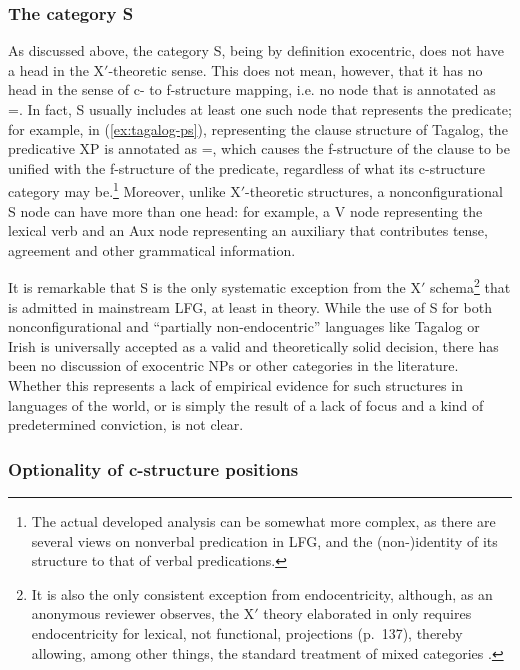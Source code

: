\documentclass[output=paper,hidelinks]{langscibook}
\begin{document}
 \subsubsection{The category S}\label{sec:CoreConcepts:S}
 
 As discussed above, the category S, being by definition exocentric, does not have a head in the X$'$-theoretic sense. This does not mean, however, that it has no head in the sense of c- to f-structure mapping, i.e. no node that is annotated as \UP=\DOWN. In fact, S usually includes at least one such node that represents the predicate; for example, in (\ref{ex:tagalog-ps}), representing the clause structure of Tagalog, the predicative XP is annotated as \UP=\DOWN, which causes the f-structure of the clause to be unified with the f-structure of the predicate, regardless of what its c-structure category may be.\footnote{The actual developed analysis can be somewhat more complex, as there are several views on nonverbal predication in LFG, and the (non-)identity of its structure to that of verbal predications.} Moreover, unlike X$'$-theoretic structures, a nonconfigurational S node can have more than one head: for example, a V node representing the lexical verb and an Aux node representing an auxiliary that contributes tense, agreement and other grammatical information.
 
 It is remarkable that S is the only systematic exception from the X$'$ schema\footnote{It is also the only consistent exception from endocentricity, although, as an anonymous reviewer observes, the X$'$ theory elaborated in \textcite{BresnanEtAl2016} only requires endocentricity for lexical, not functional, projections (p.~137), thereby allowing, among other things, the standard treatment of mixed categories \parencite[311ff.]{BresnanEtAl2016}.} that is admitted in mainstream LFG, at least in theory. While the use of S for both nonconfigurational and ``partially non-endocentric'' languages like Tagalog or Irish is universally accepted as a valid and theoretically solid decision, there has been no discussion of exocentric NPs or other categories in the literature. Whether this represents a lack of empirical evidence for such structures in languages of the world, or is simply the result of a lack of focus and a kind of predetermined conviction, is not clear.
 
 \subsubsection{Optionality of c-structure positions\label{sect:optionality}}
\end{document}
